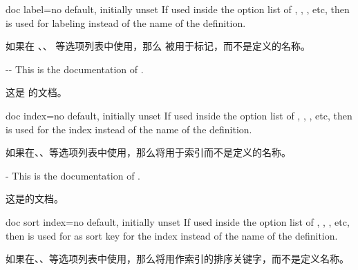 \begin{docTcbKey}[][doc new={2019-09-18}]{doc label}{=}{no default, initially unset}
If used inside the option list of , ,
, etc, then  is used
for labeling instead of the name of the definition.

如果在 、、 等选项列表中使用，那么  被用于标记，而不是定义的名称。
\begin{dispExample}
\begin{docPathOperation*}[doc label=pathline]{-{}-}{}
This is the documentation of .

这是  的文档。
\end{docPathOperation*}
\end{dispExample}
\end{docTcbKey}

\begin{docTcbKey}[][doc new={2020-01-07}]{doc index}{=}{no default, initially unset}
If used inside the option list of , ,
, etc, then  is used
for the index instead of the name of the definition.

如果在、、等选项列表中使用，那么将用于索引而不是定义的名称。
\begin{dispExample}
\begin{docPathOperation}[doc index=foo path (horizontal then vertical),
doc label=pathline2]{-\textbar}{}
This is the documentation of .

这是的文档。
\end{docPathOperation}
\end{dispExample}
\end{docTcbKey}


\begin{docTcbKey}[][doc new={2020-04-23}]{doc sort index}{=}{no default, initially unset}
If used inside the option list of , ,
, etc, then  is used
for as sort key for the index instead of the name of the definition.

如果在、、等选项列表中使用，那么将用作索引的排序关键字，而不是定义名称。
\begin{dispListing}
\begin{docCommands}[
doc name        = l_tcobox_example_tl,
doc sort index  = example_tl,  %
]{}
\end{docCommands}
\end{dispListing}
\end{docTcbKey}


